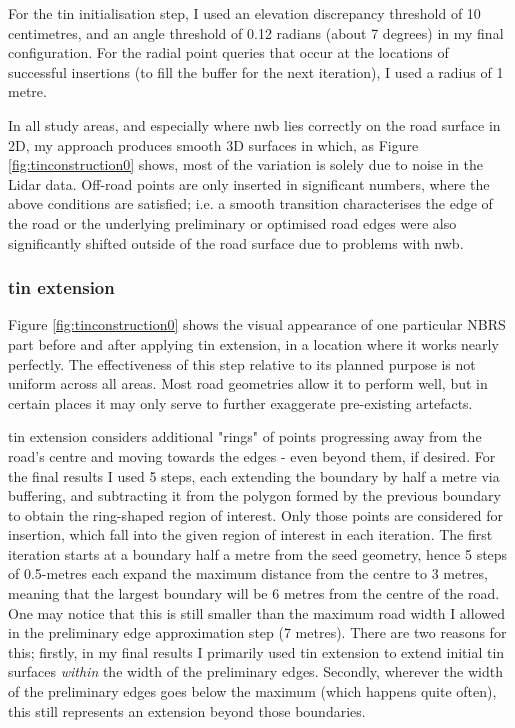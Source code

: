For the \ac{tin} initialisation step, I used an elevation discrepancy threshold of 10 centimetres, and an angle threshold of 0.12 radians (about 7 degrees) in my final configuration. For the radial point queries that occur at the locations of successful insertions (to fill the buffer for the next iteration), I used a radius of 1 metre.

In all study areas, and especially where \ac{nwb} lies correctly on the road surface in 2D, my approach produces smooth 3D surfaces in which, as Figure \ref{fig:tinconstruction0} shows, most of the variation is solely due to noise in the Lidar data. Off-road points are only inserted in significant numbers, where the above conditions are satisfied; i.e. a smooth transition characterises the edge of the road or the underlying preliminary or optimised road edges were also significantly shifted outside of the road surface due to problems with \ac{nwb}.

\subsubsection{\ac{tin} extension}

Figure \ref{fig:tinconstruction0} shows the visual appearance of one particular NBRS part before and after applying \ac{tin} extension, in a location where it works nearly perfectly. The effectiveness of this step relative to its planned purpose is not uniform across all areas. Most road geometries allow it to perform well, but in certain places it may only serve to further exaggerate pre-existing artefacts.

\ac{tin} extension considers additional "rings" of points progressing away from the road's centre and moving towards the edges - even beyond them, if desired. For the final results I used 5 steps, each extending the boundary by half a metre via buffering, and subtracting it from the polygon formed by the previous boundary to obtain the ring-shaped region of interest. Only those points are considered for insertion, which fall into the given region of interest in each iteration. The first iteration starts at a boundary half a metre from the seed geometry, hence 5 steps of 0.5-metres each expand the maximum distance from the centre to 3 metres, meaning that the largest boundary will be 6 metres from the centre of the road. One may notice that this is still smaller than the maximum road width I allowed in the preliminary edge approximation step (7 metres). There are two reasons for this; firstly, in my final results I primarily used \ac{tin} extension to extend initial \ac{tin} surfaces \textit{within} the width of the preliminary edges. Secondly, wherever the width of the preliminary edges goes below the maximum (which happens quite often), this still represents an extension beyond those boundaries.

